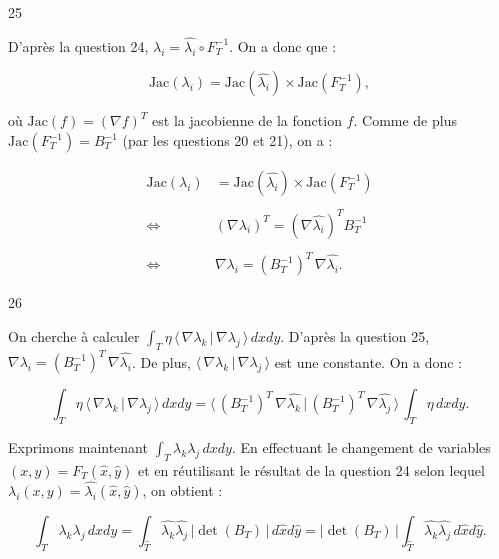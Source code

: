 \newpage

\begin{reponse}{25}

D'après la question 24, $\lambda_i = \hat{\lambda_i} \circ F_T^{-1}$. On a donc que :

\[
    \text{Jac}(\lambda_i) =  \text{Jac}(\hat{\lambda_i}) \times  \text{Jac} (F_T^{-1}),
\]

où $ \text{Jac}(f) = (\nabla f)^T$ est la jacobienne de la fonction $f$. Comme de plus $\text{Jac} (F_T^{-1}) = B_T^{-1}$ (par les questions 20 et 21), on a :

\begin{align*}
    \text{Jac}(\lambda_i) & =  \text{Jac}(\hat{\lambda_i}) \times  \text{Jac} (F_T^{-1}) \\ \\
   \Longleftrightarrow \quad & (\nabla \lambda_i)^T = (\nabla \hat{\lambda_i})^T B_T^{-1} \\ \\
   \Longleftrightarrow \quad & \nabla \lambda_i = (B_T^{-1})^T \,  \nabla \hat{\lambda_i}.
   \end{align*}
    
\end{reponse}


\begin{reponse}{26}

On cherche à calculer $\int_T \eta \, \langle \, \nabla \lambda_k \, \vert \, \nabla \lambda_j \, \rangle \, dxdy$. D'après la question 25, $\nabla \lambda_i = (B_T^{-1})^T \,  \nabla \hat{\lambda_i}$. De plus, $\langle \, \nabla \lambda_k \, \vert \, \nabla \lambda_j \, \rangle$ est une constante. On a donc :

\[
    \int_T \eta \, \langle \, \nabla \lambda_k \, \vert \, \nabla \lambda_j \, \rangle \, dxdy  = \langle \, (B_T^{-1})^T \, \nabla \hat{\lambda_k} \, \vert \, (B_T^{-1})^T \, \nabla \hat{\lambda_j} \, \rangle \, \int_T \eta \, dxdy.
\]

Exprimons maintenant $\int_T \lambda_k \lambda_j \, dxdy$. En effectuant le changement de variables $(x,y) = F_T(\hat{x}, \hat{y})$ et en réutilisant le résultat de la question 24 selon lequel $\lambda_i(x,y) = \hat{\lambda_i}(\hat{x},\hat{y})$, on obtient :

\[
    \int_T \lambda_k \lambda_j \, dxdy = \int_{\hat{T}} \hat{\lambda_k}\hat{\lambda_j} \, \vert \det(B_T) \, \vert \, d\hat{x}d\hat{y} =  \vert \det(B_T) \, \vert \int_{\hat{T}} \hat{\lambda_k}\hat{\lambda_j} \, d\hat{x}d\hat{y}.
\]
    
\end{reponse}

